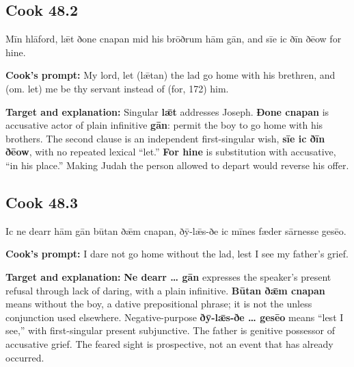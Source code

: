 \par\begin{minipage}{\linewidth}\raggedright
\subsection*{Cook 48.2}

Mīn hlāford, lǣt ðone cnapan mid his brōðrum hām gān, and sīe ic ðīn ðēow for hine.

\textbf{Cook’s prompt:} My lord, let (lǣtan) the lad go home with his brethren, and (om. let) me be thy servant instead of (for, 172) him.

\textbf{Target and explanation:} Singular \textbf{lǣt} addresses Joseph. \textbf{Ðone cnapan} is accusative actor of plain infinitive \textbf{gān}: permit the boy to go home with his brothers. The second clause is an independent first-singular wish, \textbf{sīe ic ðīn ðēow}, with no repeated lexical “let.” \textbf{For hine} is substitution with accusative, “in his place.” Making Judah the person allowed to depart would reverse his offer.

\end{minipage}\par\addvspace{4pt}

\par\begin{minipage}{\linewidth}\raggedright
\subsection*{Cook 48.3}

Ic ne dearr hām gān būtan ðǣm cnapan, ðȳ-lǣs-ðe ic mīnes fæder sārnesse gesēo.

\textbf{Cook’s prompt:} I dare not go home without the lad, lest I see my father’s grief.

\textbf{Target and explanation:} \textbf{Ne dearr … gān} expresses the speaker’s present refusal through lack of daring, with a plain infinitive. \textbf{Būtan ðǣm cnapan} means without the boy, a dative prepositional phrase; it is not the unless conjunction used elsewhere. Negative-purpose \textbf{ðȳ-lǣs-ðe … gesēo} means “lest I see,” with first-singular present subjunctive. The father is genitive possessor of accusative grief. The feared sight is prospective, not an event that has already occurred.

\end{minipage}\par\addvspace{4pt}

